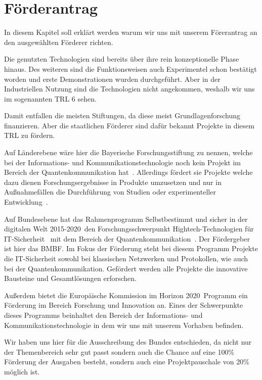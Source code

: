 \chapter{Förderantrag}\label{foerderantrag}

In diesem Kapitel soll erklärt werden warum wir uns mit unserem Förerantrag an den ausgewählten Förderer richten.

Die genutzten Technologien sind bereits über ihre rein konzeptionelle Phase hinaus.
Des weiteren sind die Funktionsweisen auch Experimentel schon bestätigt worden und erste Demonstrationen wurden durchgeführt.
Aber in der Industriellen Nutzung sind die Technologien nicht angekommen, weshalb wir uns im sogenannten \ac{TRL} 6 sehen.

Damit entfallen die meisten Stiftungen, da diese meist Grundlagenforschung finanzieren.
Aber die staatlichen Förderer sind dafür bekannt Projekte in diesem \ac{TRL} zu fördern.

Auf Länderebene wäre hier die Bayerische Forschungsstiftung zu nennen, welche bei der Informations- und Kommunikationstechnologie noch kein Projekt im Bereich der Quantenkommunikation hat~\cite{bayerischeForschungsstiftung}.
Allerdings fördert sie Projekte welche dazu dienen Forschungsergebnisse in Produkte umzusetzen und nur in Außnahmefällen die Durchführung von Studien oder experimenteller Entwicklung~\cite{bayerischeForschungsstiftung}.

Auf Bundesebene hat das Rahmenprogramm \glqq Selbstbestimmt und sicher in der digitalen Welt 2015-2020\grqq~den Forschungsschwerpunkt \glqq Hightech-Technologien für IT-Sicherheit \grqq~mit dem Bereich der Quantenkommunikation~\cite{BundRahmenprogramm}.
Der Fördergeber ist hier das \ac{BMBF}.
Im Fokus der Förderung steht bei diesem Programm Projekte die IT-Sicherheit sowohl bei klassischen Netzwerken und Protokollen, wie auch bei der Quantenkommunikation.
Gefördert werden alle Projekte die innovative Bausteine und Gesamtlösungen erforschen.

Außerdem bietet die Europäische Kommission im \glqq Horizon 2020\grqq~Programm ein Förderung im Bereich Forschung und Innovation an.
Eines der Schwerpunkte dieses Programms beinhaltet den Bereich der Informations- und Kommunikationstechnologie in dem wir uns mit unserem Vorhaben befinden.

Wir haben uns hier für die Ausschreibung des Bundes entschieden, da nicht nur der Themenbereich sehr gut passt sondern auch die Chance auf eine 100\% Förderung der Ausgaben besteht, sondern auch eine Projektpauschale von 20\% möglich ist.



